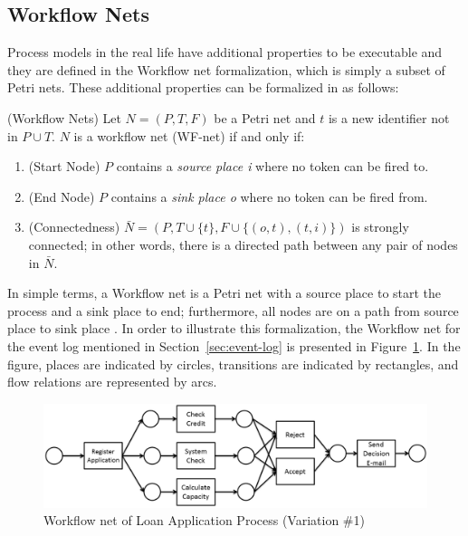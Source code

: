 \subsection{Workflow Nets}
\label{sec:workflow-nets}
Process models in the real life have additional properties to be executable and they are defined in the Workflow net formalization, which is simply a subset of Petri nets. These additional properties can be formalized in \cite{van2013discovering} as follows:
\theoremstyle{definition}
\begin{definition}{}
(Workflow Nets) Let $N = (P, T, F)$ be a Petri net and $t$ is a new identifier not in $P \cup T$. $N$ is a workflow net (WF-net) if and only if:
\begin{enumerate}
  \item (Start Node) $P$ contains a \textit{source place i} where no token can be fired to.
  \item (End Node) $P$ contains a \textit{sink place o} where no token can be fired from.
  \item (Connectedness) $\bar{N} = (P, T \cup \{t\}, F \cup \{(o,t),(t, i)\})$ is strongly connected; in other words, there is a directed path between any pair of nodes in $\bar{N}$.
\end{enumerate}
\end{definition}

In simple terms, a Workflow net is a Petri net with a source place to start the process and a sink place to end; furthermore, all nodes are on a path from source place to sink place \cite{van1998application}.  In order to illustrate this formalization, the Workflow net for the event log mentioned in Section~\ref{sec:event-log} is presented in Figure~\ref{fig:loan-petri-net}. In the figure, places are indicated by circles, transitions are indicated by rectangles, and flow relations are represented by arcs. 
\begin{figure}
  \centering
  \includegraphics[width=\textwidth]{3_background/loan-petri-net}
  \caption{Workflow net of Loan Application Process (Variation \#1)}
  \label{fig:loan-petri-net}
\end{figure}

